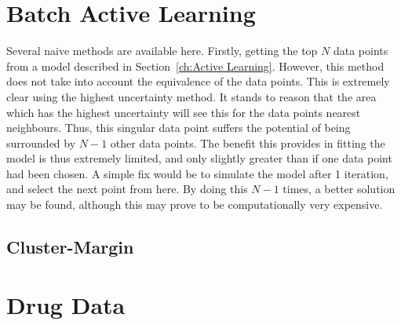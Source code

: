 \documentclass[a4paper, english]{report}
\begin{document}
\section{Batch Active Learning}
Several naive methods are available here. Firstly, getting the top $N$ data points from a model described in Section~\ref{ch:Active Learning}. However, this method does not take into account the equivalence of the data points. This is extremely clear using the highest uncertainty method. It stands to reason that the area which has the highest uncertainty will see this for the data points nearest neighbours. Thus, this singular data point suffers the potential of being surrounded by $N-1$ other data points. The benefit this provides in fitting the model is thus extremely limited, and only slightly greater than if one data point had been chosen. A simple fix would be to simulate the model after 1 iteration, and select the next point from here. By doing this $N-1$ times, a better solution may be found, although this may prove to be computationally very expensive.
\subsection{Cluster-Margin}
\section{Drug Data}
\blindtext[2]{}

\printbibliography{}
\appendix
\end{document}

